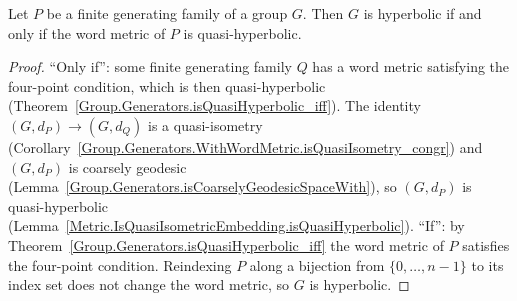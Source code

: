 \begin{theorem}
  \label{Group.Generators.isHyperbolic_iff_isQuasiHyperbolic}
  Let $P$ be a finite generating family of a group $G$. Then $G$ is hyperbolic if and only if the
  word metric of $P$ is quasi-hyperbolic.
\end{theorem}
\begin{proof}
  ``Only if'': some finite generating family $Q$ has a word metric satisfying the four-point
  condition, which is then quasi-hyperbolic
  (Theorem~\ref{Group.Generators.isQuasiHyperbolic_iff}). The identity $(G, d_P) \to (G, d_Q)$ is a
  quasi-isometry (Corollary~\ref{Group.Generators.WithWordMetric.isQuasiIsometry_congr}) and
  $(G, d_P)$ is coarsely geodesic (Lemma~\ref{Group.Generators.isCoarselyGeodesicSpaceWith}), so
  $(G, d_P)$ is quasi-hyperbolic (Lemma~\ref{Metric.IsQuasiIsometricEmbedding.isQuasiHyperbolic}).
  ``If'': by Theorem~\ref{Group.Generators.isQuasiHyperbolic_iff} the word metric of $P$ satisfies
  the four-point condition. Reindexing $P$ along a bijection from $\{0, \dots, n - 1\}$ to its
  index set does not change the word metric, so $G$ is hyperbolic.
\end{proof}

